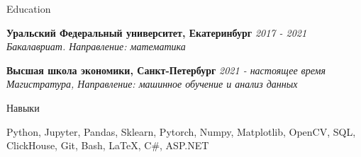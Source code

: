 \documentclass{resume} %
\begin{document}

\begin{rSection}{Education}

{\bf Уральский Федеральный университет, Екатеринбург } \hfill {\em 2017 -  2021} 
\\{ \textit { Бакалавриат. Направление: математика  }} 

{\bf Высшая школа экономики, Санкт-Петербург } \hfill {\em 2021 - настоящее время} 
\\ { \textit {Магистратура, Направление: машинное обучение и анализ данных}} \hfill


\end{rSection}




\begin{rSection}{Навыки}

Python, Jupyter, Pandas, Sklearn, Pytorch, Numpy, Matplotlib, OpenCV, SQL, ClickHouse, Git, Bash, \LaTeX{},  C\#, ASP.NET \\

\end{rSection}
\end{document}
